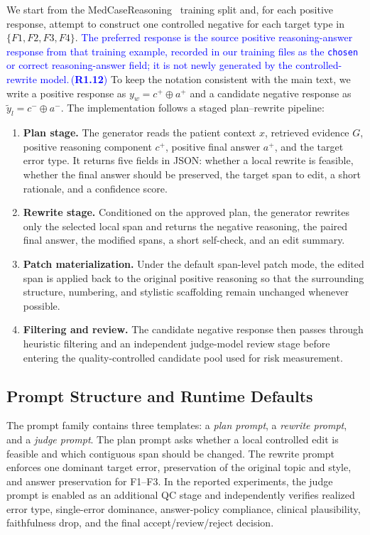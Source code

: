 \documentclass[a4paper,fleqn,doubleblind]{cas-sc}
\DeclareRobustCommand{\added}[1]{\textcolor{blue}{#1}}
\DeclareRobustCommand{\revtag}[1]{\textcolor{blue}{\scriptsize\,(\textbf{#1})}}
\begin{document}
We start from the MedCaseReasoning~\cite{wu2025medcasereasoning} training split and, for each positive response, attempt to construct one controlled negative for each target type in $\{F1,F2,F3,F4\}$. \added{The preferred response is the source positive reasoning-answer response from that training example, recorded in our training files as the \texttt{chosen} or correct reasoning-answer field; it is not newly generated by the controlled-rewrite model.}\revtag{R1.12} To keep the notation consistent with the main text, we write a positive response as $y_w = c^{+} \oplus a^{+}$ and a candidate negative response as $\tilde{y}_l = c^{-} \oplus a^{-}$. The implementation follows a staged plan--rewrite pipeline:
\begin{enumerate}[leftmargin=*]
    \item \textbf{Plan stage.} The generator reads the patient context $x$, retrieved evidence $G$, positive reasoning component $c^{+}$, positive final answer $a^{+}$, and the target error type. It returns five fields in JSON: whether a local rewrite is feasible, whether the final answer should be preserved, the target span to edit, a short rationale, and a confidence score.
    \item \textbf{Rewrite stage.} Conditioned on the approved plan, the generator rewrites only the selected local span and returns the negative reasoning, the paired final answer, the modified spans, a short self-check, and an edit summary.
    \item \textbf{Patch materialization.} Under the default span-level patch mode, the edited span is applied back to the original positive reasoning so that the surrounding structure, numbering, and stylistic scaffolding remain unchanged whenever possible.
    \item \textbf{Filtering and review.} The candidate negative response then passes through heuristic filtering and an independent judge-model review stage before entering the quality-controlled candidate pool used for risk measurement.
\end{enumerate}

\subsection{Prompt Structure and Runtime Defaults}

The prompt family contains three templates: a \textit{plan prompt}, a \textit{rewrite prompt}, and a \textit{judge prompt}. The plan prompt asks whether a local controlled edit is feasible and which contiguous span should be changed. The rewrite prompt enforces one dominant target error, preservation of the original topic and style, and answer preservation for F1--F3. In the reported experiments, the judge prompt is enabled as an additional QC stage and independently verifies realized error type, single-error dominance, answer-policy compliance, clinical plausibility, faithfulness drop, and the final accept/review/reject decision.
\end{document}

